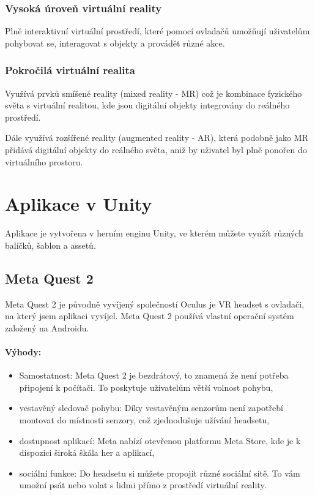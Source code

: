 \documentclass[12pt, a4paper,
twoside,        %
openright
]{report}
\let\oldchapter\chapter
\renewcommand{\chapter}{
	\clearpage
	\pagestyle{fancy}
	\oldchapter
}
\begin{document}
\subsection{Vysoká úroveň virtuální reality}
Plně interaktivní virtuální prostředí, které pomocí ovladačů umožňují uživatelům pohybovat se, interagovat s objekty a provádět různé akce.

\subsection{Pokročilá virtuální realita}
Využívá prvků smíšené reality (mixed reality - MR) což je kombinace fyzického světa s virtuální realitou, kde jsou digitální objekty integrovány do reálného prostředí.

Dále využívá rozšířené reality (augmented reality - AR), která podobně jako MR přidává digitální objekty do reálného světa, aniž by uživatel byl plně ponořen do virtuálního prostoru.

\chapter{Aplikace v Unity}	

Aplikace je vytvořena v herním enginu Unity, ve kterém můžete využít různých balíčků, šablon a assetů.

	\section{Meta Quest 2}
\label{sec:meta_quest_2}

	Meta Quest 2 je původně vyvíjený společností Oculus je VR headset s ovladači, na který jsem aplikaci vyvíjel. Meta Quest 2 používá vlastní operační systém založený na Androidu.
	
	\subsubsection{Výhody:}
	\begin{itemize}
		\item Samostatnost: Meta Quest 2 je bezdrátový, to znamená že není potřeba připojení k počítači. To poskytuje uživatelům větší volnost pohybu,
		\item vestavěný sledovač pohybu: Díky vestavěným senzorům není zapotřebí montovat do místnosti senzory, což zjednodušuje užívání headsetu,
		\item dostupnost aplikací: Meta nabízí otevřenou platformu Meta Store, kde je k dispozici široká škála her a aplikací,
		\item sociální funkce: Do headsetu si můžete propojit různé sociální sítě. To vám umožní psát nebo volat s lidmi přímo z prostředí virtuální reality.
	\end{itemize}
	
\end{document}
